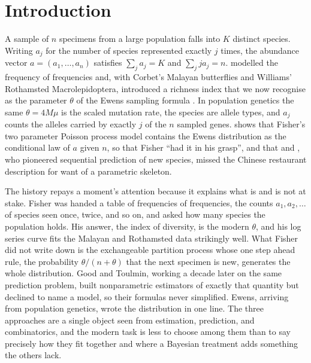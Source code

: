 \section{Introduction}\label{pig:sec:intro}

A sample of $n$ specimens from a large population falls into $K$ distinct species. Writing $a_j$ for the number of species represented exactly $j$ times, the abundance vector $a=(a_1,\dots,a_n)$ satisfies $\sum_j a_j=K$ and $\sum_j j a_j=n$. \citet{pig:fisher1943} modelled the frequency of frequencies and, with Corbet's Malayan butterflies and Williams' Rothamsted Macrolepidoptera, introduced a richness index that we now recognise as the parameter $\theta$ of the Ewens sampling formula \citep{pig:ewens1972}. In population genetics the same $\theta=4M\mu$ is the scaled mutation rate, the species are allele types, and $a_j$ counts the alleles carried by exactly $j$ of the $n$ sampled genes. \citet{pig:mccullagh2016} shows that Fisher's two parameter Poisson process model contains the Ewens distribution as the conditional law of $a$ given $n$, so that Fisher ``had it in his grasp'', and that \citet{pig:good1953} and \citet{pig:goodtoulmin1956}, who pioneered sequential prediction of new species, missed the Chinese restaurant description for want of a parametric skeleton.

The history repays a moment's attention because it explains what is and is not at stake. Fisher was handed a table of frequencies of frequencies, the counts $a_1,a_2,\dots$ of species seen once, twice, and so on, and asked how many species the population holds. His answer, the index of diversity, is the modern $\theta$, and his log series curve fits the Malayan and Rothamsted data strikingly well. What Fisher did not write down is the exchangeable partition process whose one step ahead rule, the probability $\theta/(n+\theta)$ that the next specimen is new, generates the whole distribution. Good and Toulmin, working a decade later on the same prediction problem, built nonparametric estimators of exactly that quantity but declined to name a model, so their formulas never simplified. Ewens, arriving from population genetics, wrote the distribution in one line. The three approaches are a single object seen from estimation, prediction, and combinatorics, and the modern task is less to choose among them than to say precisely how they fit together and where a Bayesian treatment adds something the others lack.

